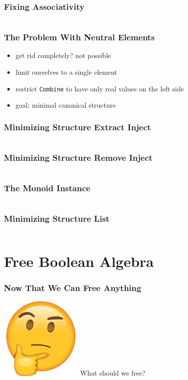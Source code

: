 \documentclass{beamer}
\begin{document}
\begin{frame}
  \frametitle{Fixing Associativity}
  \inputminted[highlightlines={11,13,7}, highlightcolor=yellow!40]{scala}{snippets/free-monoid-2.scala}
\end{frame}

\begin{frame}
  \frametitle{The Problem With Neutral Elements}
  \begin{itemize}
  \item get rid completely? not possible
  \item limit ourselves to a single element
  \item restrict \texttt{Combine} to have only real values on the left side
  \item goal: minimal canonical structure
  \end{itemize}
\end{frame}

\begin{frame}
  \frametitle{Minimizing Structure \textemdash{} Extract Inject}
  \inputminted[highlightlines={1, 7}, highlightcolor=yellow!40]{scala}{snippets/free-monoid-3.scala}
\end{frame}

\begin{frame}
  \frametitle{Minimizing Structure \textemdash{} Remove Inject}
  \inputminted[highlightlines={5}, highlightcolor=yellow!40]{scala}{snippets/free-monoid-4.scala}
\end{frame}

\begin{frame}
  \frametitle{The Monoid Instance}
  \inputminted{scala}{snippets/free-monoid-instance.scala}
\end{frame}

\begin{frame}
  \frametitle{Minimizing Structure \textemdash{} List}
  \inputminted{scala}{snippets/free-monoid-5.scala}
\end{frame}

\section{Free Boolean Algebra}\label{sec:free-boolean-algebra}

\begin{frame}
  \frametitle{Now That We Can Free Anything}
  \begin{center}
    \includegraphics[width=0.3\textwidth]{static-images/thinking.png}
    \vfill
    {\Huge What should we free?}
    \vfill
  \end{center}
\end{frame}
\end{document}
